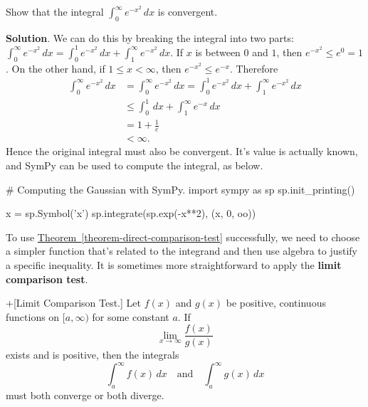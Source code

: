 \documentclass[10pt,]{book}
\newcommand{\terminology}[1]{\textbf{#1}}
\theoremstyle{ptxplainnotitle}
\theoremstyle{ptxplaintitle}
\theoremstyle{ptxplainnotitle}
\theoremstyle{ptxplaintitle}
\theoremstyle{ptxplainnotitle}
\theoremstyle{ptxplaintitle}
\theoremstyle{ptxdefinitionnotitle}
\theoremstyle{ptxdefinitiontitle}
\theoremstyle{ptxdefinitionnotitle}
\theoremstyle{ptxdefinitiontitle}
\theoremstyle{ptxdefinitionnotitle}
\theoremstyle{ptxdefinitiontitle}
\theoremstyle{ptxdefinitionnotitle}
\theoremstyle{ptxdefinitiontitle}
\theoremstyle{ptxdefinitionnotitle}
\theoremstyle{ptxdefinitiontitle}
\numberwithin{equation}{section}
\newcommand{\lt}{<}
\begin{document}
\begin{example}\label{example-the-gaussian-integral}
\hypertarget{p-606}{}%
Show that the integral \(\int_{0}^{\infty}e^{-x^{2}}\,dx\) is convergent.%
\par\smallskip%
\noindent\textbf{Solution}.\hypertarget{solution-132}{}\quad%
\hypertarget{p-607}{}%
We can do this by breaking the integral into two parts: \(\int_{0}^{\infty}e^{-x^{2}}\,dx = \int_{0}^{1}e^{-x^{2}}\,dx + \int_{1}^{\infty}e^{-x^{2}}\,dx.\) If \(x\) is between \(0\) and \(1\), then \(e^{-x^{2}} \leq e^{0} = 1\). On the other hand, if \(1\leq x\lt \infty\), then \(e^{-x^{2}} \leq e^{-x}\). Therefore%
\begin{align*}
\int_{0}^{\infty}e^{-x^{2}}\,dx & = \int_{0}^{\infty}e^{-x^{2}}\,dx = \int_{0}^{1}e^{-x^{2}}\,dx + \int_{1}^{\infty}e^{-x^{2}}\,dx\\
& \leq \int_{0}^{1}\,dx + \int_{1}^{\infty}e^{-x}\,dx \\
& = 1 + \frac{1}{e} \\
& \lt \infty.
\end{align*}
Hence the original integral must also be convergent. It's value is actually known, and SymPy can be used to compute the integral, as below.%
\end{example}
\begin{sageinput}
# Computing the Gaussian with SymPy.
import sympy as sp
sp.init_printing()

x = sp.Symbol('x')
sp.integrate(sp.exp(-x**2), (x, 0, oo))
\end{sageinput}
\hypertarget{p-608}{}%
To use \hyperref[theorem-direct-comparison-test]{Theorem~\ref{theorem-direct-comparison-test}} successfully, we need to choose a simpler function that's related to the integrand and then use algebra to justify a specific inequality. It is sometimes more straightforward to apply the \terminology{limit comparison test}.%
\begin{theorem}+[{Limit Comparison Test.}]\label{theorem-limit-comparison-test}
\hypertarget{p-609}{}%
Let \(f(x)\) and \(g(x)\) be positive, continuous functions on \([a,\infty)\) for some constant \(a\). If%
\begin{equation*}
\lim_{x\to\infty}\frac{f(x)}{g(x)}
\end{equation*}
exists and is positive, then the integrals%
\begin{equation*}
\int_{a}^{\infty}f(x)\,dx\quad\text{and}\quad\int_{a}^{\infty}g(x)\,dx
\end{equation*}
must both converge or both diverge.%
\end{theorem}
\end{document}
